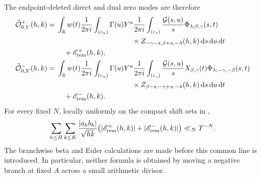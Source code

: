 The endpoint-deleted direct and dual zero modes are therefore
\begin{align}
 \widetilde{\mathcal O}_{0,Y}^+(h,k)
 ={}&\int_{\R}w(t)\frac{1}{2\pi i}\int_{(c_u)}\Gamma(u)Y^u
 \frac{1}{2\pi i}\int_{(c_s)}\frac{\mathcal G(s,u)}s
 \Phi_{\lambda;\beta,\gamma}(s,t)\notag\\
 &\hspace{37mm}\times
 Z_{-\gamma-s,\beta+s,-\lambda}(h,k)\dd s\dd u\dd t\notag\\
 &\quad+\mathscr E_{\rm rem}^+(h,k),
 \label{eq:zero-plus-evaluated}\\
 \widetilde{\mathcal O}_{0,Y}^-(h,k)
 ={}&\int_{\R}w(t)\frac{1}{2\pi i}\int_{(c_u)}\Gamma(u)Y^u
 \frac{1}{2\pi i}\int_{(c_s)}\frac{\mathcal G(s,u)}s
 X_{\beta,\gamma}(t)
 \Phi_{\lambda;-\gamma,-\beta}(s,t)\notag\\
 &\hspace{37mm}\times
 Z_{\beta-s,-\gamma+s,-\lambda}(h,k)\dd s\dd u\dd t\notag\\
 &\quad+\mathscr E_{\rm rem}^-(h,k).
 \label{eq:zero-minus-evaluated}
\end{align}
For every fixed $N$, locally uniformly on the compact shift sets in
,
\begin{equation}\label{eq:remote-remainder-bound}
 \sum_{h\leq H}\sum_{k\leq K}
 \frac{|a_hb_k|}{\sqrt{hk}}
 \bigl(|\mathscr E_{\rm rem}^+(h,k)|
      +|\mathscr E_{\rm rem}^-(h,k)|\bigr)
 \ll_N T^{-N}.
\end{equation}
The branchwise beta and Euler calculations are made before this common line
is introduced.  In particular, neither formula is obtained by moving a
negative branch at fixed $A$ across a small arithmetic divisor.
